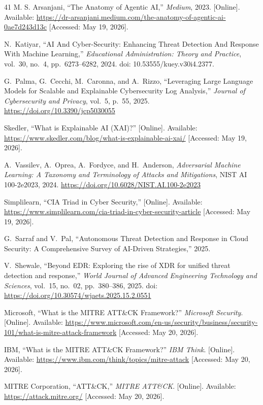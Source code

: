 \documentclass[12pt,a4paper]{report}
\begin{document}
\begin{thebibliography}{41}
M. S. Arsanjani,
``The Anatomy of Agentic AI,''
\textit{Medium}, 2023.
[Online]. Available:
\url{https://dr-arsanjani.medium.com/the-anatomy-of-agentic-ai-0ae7d243d13c}
[Accessed: May 19, 2026].

N.\ Katiyar, ``AI And Cyber-Security: Enhancing Threat Detection And Response With Machine
Learning,'' \textit{Educational Administration: Theory and Practice}, vol.\ 30, no.\ 4,
pp.\ 6273--6282, 2024. doi: 10.53555/kuey.v30i4.2377.

G.\ Palma, G.\ Cecchi, M.\ Caronna, and A.\ Rizzo, ``Leveraging Large Language Models for
Scalable and Explainable Cybersecurity Log Analysis,'' \textit{Journal of Cybersecurity and
Privacy}, vol.\ 5, p.\ 55, 2025. \url{https://doi.org/10.3390/jcp5030055}

Skedler,
``What is Explainable AI (XAI)?''
[Online]. Available:
\url{https://www.skedler.com/blog/what-is-explainable-ai-xai/}
[Accessed: May 19, 2026].

A.\ Vassilev, A.\ Oprea, A.\ Fordyce, and H.\ Anderson, \textit{Adversarial Machine Learning:
A Taxonomy and Terminology of Attacks and Mitigations}, NIST AI 100-2e2023, 2024.
\url{https://doi.org/10.6028/NIST.AI.100-2e2023}

Simplilearn,
``CIA Triad in Cyber Security,''
[Online]. Available:
\url{https://www.simplilearn.com/cia-triad-in-cyber-security-article}
[Accessed: May 19, 2026].

G.\ Sarraf and V.\ Pal, ``Autonomous Threat Detection and Response in Cloud Security:
A Comprehensive Survey of AI-Driven Strategies,'' 2025.

V.\ Shewale, ``Beyond EDR: Exploring the rise of XDR for unified threat detection and
response,'' \textit{World Journal of Advanced Engineering Technology and Sciences},
vol.\ 15, no.\ 02, pp.\ 380--386, 2025.
doi: \url{https://doi.org/10.30574/wjaets.2025.15.2.0551}

Microsoft,
``What is the MITRE ATT\&CK Framework?''
\textit{Microsoft Security}.
[Online]. Available:
\url{https://www.microsoft.com/en-us/security/business/security-101/what-is-mitre-attack-framework}
[Accessed: May 20, 2026].

IBM,
``What is the MITRE ATT\&CK Framework?''
\textit{IBM Think}.
[Online]. Available:
\url{https://www.ibm.com/think/topics/mitre-attack}
[Accessed: May 20, 2026].

MITRE Corporation,
``ATT\&CK,''
\textit{MITRE ATT\&CK}.
[Online]. Available:
\url{https://attack.mitre.org/}
[Accessed: May 20, 2026].


\end{thebibliography}
\end{document}
